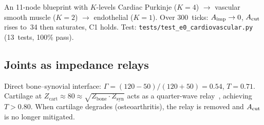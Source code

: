 \documentclass[aps,pre,twocolumn,superscriptaddress,floatfix]{revtex4-2}
\begin{document}
An 11-node blueprint with $K$-levels
Cardiac Purkinje ($K=4$) $\to$ vascular smooth muscle
($K=2$) $\to$ endothelial ($K=1$).
Over 300~ticks: $A_{\text{imp}} \to 0$, $A_{\text{cut}}$ rises to~34
then saturates, C1 holds.
Test: \texttt{tests/test\_e0\_cardiovascular.py}
(13~tests, 100\% pass).

\subsection{Joints as impedance relays}

Direct bone--synovial interface:
$\Gamma = (120-50)/(120+50) = 0.54$, $T = 0.71$.
Cartilage at
$Z_{\text{cart}} \approx 80 \approx
\sqrt{Z_{\text{bone}}\cdot Z_{\text{syn}}}$
acts as a quarter-wave relay~\cite{Pozar2011},
achieving $T > 0.80$.
When cartilage degrades (osteoarthritis), the relay is
removed and $A_{\text{cut}}$ is no longer mitigated.
\end{document}
